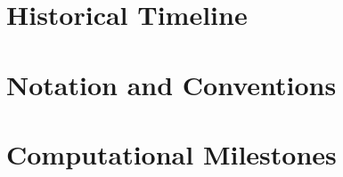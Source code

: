 \documentclass[12pt,a4paper,twoside]{book}
\theoremstyle{plain}
\theoremstyle{definition}
\theoremstyle{remark}
\begin{document}
\chapter{Historical Timeline}
\label{app:timeline}


\chapter{Notation and Conventions}
\label{app:notation}


\chapter{Computational Milestones}
\label{app:computational}


\backmatter

\nocite{*}

\printbibliography[heading=bibintoc,title={Bibliography}]

\printindex
\end{document}
